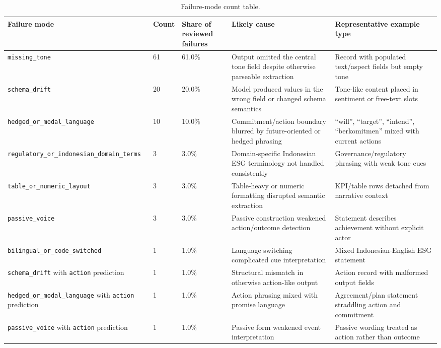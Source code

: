 \documentclass[english, online, cse, master]{dithesis}
\begin{document}
\begin{table}[htbp]
\centering
\caption{Failure-mode count table.}
\label{tab:failure-mode-count-table}
\footnotesize
\setlength{\tabcolsep}{4pt}
\renewcommand{\arraystretch}{1.15}
\begin{tabularx}{\linewidth}{|X|X|X|X|X|}
\hline
\textbf{Failure mode} & \textbf{Count} & \textbf{Share of reviewed failures} & \textbf{Likely cause} & \textbf{Representative example type} \\ \hline
\texttt{missing\_tone} & 61 & 61.0\% & Output omitted the central tone field despite otherwise parseable extraction & Record with populated text/aspect fields but empty tone \\ \hline
\texttt{schema\_drift} & 20 & 20.0\% & Model produced values in the wrong field or changed schema semantics & Tone-like content placed in sentiment or free-text slots \\ \hline
\texttt{hedged\_or\_modal\_language} & 10 & 10.0\% & Commitment/action boundary blurred by future-oriented or hedged phrasing & “will”, “target”, “intend”, “berkomitmen” mixed with current actions \\ \hline
\texttt{regulatory\_or\_indonesian\_domain\_terms} & 3 & 3.0\% & Domain-specific Indonesian ESG terminology not handled consistently & Governance/regulatory phrasing with weak tone cues \\ \hline
\texttt{table\_or\_numeric\_layout} & 3 & 3.0\% & Table-heavy or numeric formatting disrupted semantic extraction & KPI/table rows detached from narrative context \\ \hline
\texttt{passive\_voice} & 3 & 3.0\% & Passive construction weakened action/outcome detection & Statement describes achievement without explicit actor \\ \hline
\texttt{bilingual\_or\_code\_switched} & 1 & 1.0\% & Language switching complicated cue interpretation & Mixed Indonesian-English ESG statement \\ \hline
\texttt{schema\_drift} with \texttt{action} prediction & 1 & 1.0\% & Structural mismatch in otherwise action-like output & Action record with malformed output fields \\ \hline
\texttt{hedged\_or\_modal\_language} with \texttt{action} prediction & 1 & 1.0\% & Action phrasing mixed with promise language & Agreement/plan statement straddling action and commitment \\ \hline
\texttt{passive\_voice} with \texttt{action} prediction & 1 & 1.0\% & Passive form weakened event interpretation & Passive wording treated as action rather than outcome \\ \hline
\end{tabularx}
\end{table}
\end{document}

